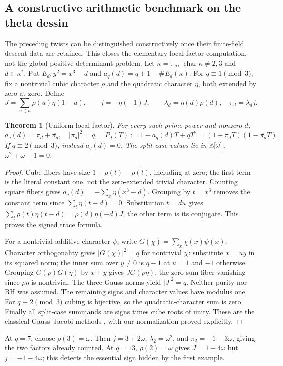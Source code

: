 \documentclass[11pt]{article}
\newtheorem{theorem}{Theorem}[section]
\theoremstyle{definition}\newtheorem{definition}[theorem]{Definition}
\theoremstyle{remark}\newtheorem{remark}[theorem]{Remark}
\begin{document}
\subsection{A constructive arithmetic benchmark on the theta dessin}
The preceding twists can be distinguished constructively once their finite-field descent data are retained. This closes the elementary local-factor computation, not the global positive-determinant problem. Let $\kappa=\mathbb F_q$, $\operatorname{char}\kappa\ne2,3$ and $d\in\kappa^*$. Put $E_d:y^2=x^3-d$ and $a_q(d)=q+1-\#E_d(\kappa)$. For $q\equiv1\pmod3$, fix a nontrivial cubic character $\rho$ and the quadratic character $\eta$, both extended by zero at zero. Define
\[
 J=\sum_{u\in\kappa}\rho(u)\eta(1-u),\qquad
 j=-\eta(-1)J,\qquad \lambda_d=\eta(d)\rho(d),\quad \pi_d=\lambda_dj.
\]
\begin{theorem}[Uniform local factor]\label{thm:jacobitheta}
For every such prime power and nonzero $d$,
\[
 a_q(d)=\pi_d+\overline{\pi_d},\quad |\pi_d|^2=q,\quad
 P_d(T):=1-a_q(d)T+qT^2=(1-\pi_dT)(1-\overline{\pi_d}T).
\]
If $q\equiv2\pmod3$, instead $a_q(d)=0$. The split-case values lie in $\mathbb Z[\omega]$, $\omega^2+\omega+1=0$.
\end{theorem}
\begin{proof}
Cube fibers have size $1+\rho(t)+\overline{\rho(t)}$, including at zero; the first term is the literal constant one, not the zero-extended trivial character. Counting square fibers gives $a_q(d)=-\sum_x\eta(x^3-d)$. Grouping by $t=x^3$ removes the constant term since $\sum_t\eta(t-d)=0$. Substitution $t=du$ gives $\sum_t\rho(t)\eta(t-d)=\rho(d)\eta(-d)J$; the other term is its conjugate. This proves the signed trace formula.

For a nontrivial additive character $\psi$, write $G(\chi)=\sum_x\chi(x)\psi(x)$. Character orthogonality gives $|G(\chi)|^2=q$ for nontrivial $\chi$: substitute $x=uy$ in its squared norm; the inner sum over $y\ne0$ is $q-1$ at $u=1$ and $-1$ otherwise. Grouping $G(\rho)G(\eta)$ by $x+y$ gives $JG(\rho\eta)$, the zero-sum fiber vanishing since $\rho\eta$ is nontrivial. The three Gauss norms yield $|J|^2=q$. Neither purity nor RH was assumed. The remaining signs and character values have modulus one. For $q\equiv2\pmod3$ cubing is bijective, so the quadratic-character sum is zero. Finally all split-case summands are signs times cube roots of unity. These are the classical Gauss--Jacobi methods \cite[pp.499--502]{WeilJacobi}, with our normalization proved explicitly.
\end{proof}
At $q=7$, choose $\rho(3)=\omega$. Then $j=3+2\omega$, $\lambda_2=\omega^2$, and $\pi_2=-1-3\omega$, giving the two factors already counted. At $q=13$, $\rho(2)=\omega$ gives $J=1+4\omega$ but $j=-1-4\omega$; this detects the essential sign hidden by the first example.
\end{document}
